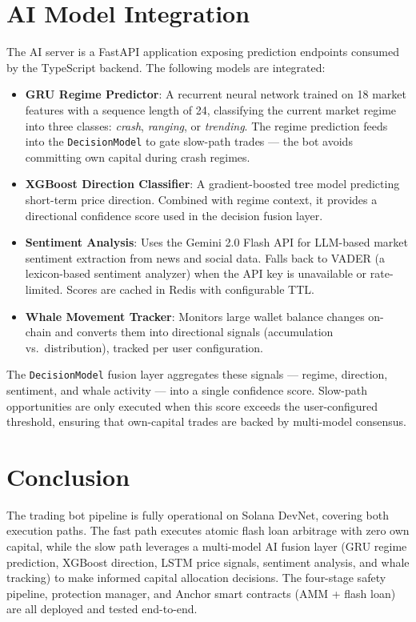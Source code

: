 \documentclass[12pt,a4paper]{article}
\begin{document}
\section{AI Model Integration}

The AI server is a FastAPI application exposing prediction endpoints consumed by the TypeScript backend. The following models are integrated:

\begin{itemize}[nosep]
    \item \textbf{GRU Regime Predictor}: A recurrent neural network trained on 18 market features with a sequence length of 24, classifying the current market regime into three classes: \emph{crash}, \emph{ranging}, or \emph{trending}. The regime prediction feeds into the \texttt{DecisionModel} to gate slow-path trades --- the bot avoids committing own capital during crash regimes.
    \item \textbf{XGBoost Direction Classifier}: A gradient-boosted tree model predicting short-term price direction. Combined with regime context, it provides a directional confidence score used in the decision fusion layer.
    \item \textbf{Sentiment Analysis}: Uses the Gemini 2.0 Flash API for LLM-based market sentiment extraction from news and social data. Falls back to VADER (a lexicon-based sentiment analyzer) when the API key is unavailable or rate-limited. Scores are cached in Redis with configurable TTL.
    \item \textbf{Whale Movement Tracker}: Monitors large wallet balance changes on-chain and converts them into directional signals (accumulation vs.\ distribution), tracked per user configuration.
\end{itemize}

The \texttt{DecisionModel} fusion layer aggregates these signals --- regime, direction, sentiment, and whale activity --- into a single confidence score. Slow-path opportunities are only executed when this score exceeds the user-configured threshold, ensuring that own-capital trades are backed by multi-model consensus.

\section{Conclusion}

The trading bot pipeline is fully operational on Solana DevNet, covering both execution paths. The fast path executes atomic flash loan arbitrage with zero own capital, while the slow path leverages a multi-model AI fusion layer (GRU regime prediction, XGBoost direction, LSTM price signals, sentiment analysis, and whale tracking) to make informed capital allocation decisions. The four-stage safety pipeline, protection manager, and Anchor smart contracts (AMM + flash loan) are all deployed and tested end-to-end.
\end{document}
